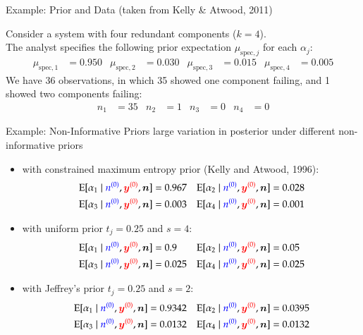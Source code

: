 \documentclass{beamer}
\def\rot#1{{\color{red}#1}}
\def\gruen#1{{\color{blue}#1}}
\def\byzr{\rot{\byz}}
\def\nzg{\gruen{\nz}}
\begin{document}
\begin{frame}{Example: Prior and Data}
  (taken from Kelly \& Atwood, 2011) %

  \begin{example}
    Consider a system with four redundant components ($k=4$). \\
    The analyst specifies
    the following prior expectation $\mu_{\text{spec},j}$
    for each $\alpha_j$:
    \begin{align*}
      \mu_{\text{spec},1}&=0.950
      &
      \mu_{\text{spec},2}&=0.030
      &
      \mu_{\text{spec},3}&=0.015
      &
      \mu_{\text{spec},4}&=0.005
    \end{align*}
    We have 36 observations, in which 35 showed one component failing,
    and 1 showed two components failing:
    \begin{align*}
      n_1&=35
      &
      n_2&=1
      &
      n_3&=0
      &
      n_4&=0
    \end{align*}
  \end{example}
\end{frame}

\begin{frame}{Example: Non-Informative Priors}
  \alert{large variation in posterior under different non-informative priors} \\
  \begin{itemize}
  \item with constrained maximum entropy prior (Kelly and Atwood, 1996): %
    \begin{align*}
      \E[\alpha_1\mid\nzg,\byzr,\vec{n}]&=0.967
      &
      \E[\alpha_2\mid\nzg,\byzr,\vec{n}]&=0.028
      \\
      \E[\alpha_3\mid\nzg,\byzr,\vec{n}]&=0.003
      &
      \E[\alpha_4\mid\nzg,\byzr,\vec{n}]&=0.001
    \end{align*}
  \item 
  with uniform prior $t_j=0.25$ and $s=4$:
  \begin{align*}
    \E[\alpha_1\mid\nzg,\byzr,\vec{n}]&=0.9
    &
    \E[\alpha_2\mid\nzg,\byzr,\vec{n}]&=0.05
    \\
    \E[\alpha_3\mid\nzg,\byzr,\vec{n}]&=0.025
    &
    \E[\alpha_4\mid\nzg,\byzr,\vec{n}]&=0.025
  \end{align*}
  \item
  with Jeffrey's prior $t_j=0.25$ and $s=2$:
  \begin{align*}
    \E[\alpha_1\mid\nzg,\byzr,\vec{n}]&=0.9342
    &
    \E[\alpha_2\mid\nzg,\byzr,\vec{n}]&=0.0395
    \\
    \E[\alpha_3\mid\nzg,\byzr,\vec{n}]&=0.0132
    &
    \E[\alpha_4\mid\nzg,\byzr,\vec{n}]&=0.0132
  \end{align*}
  \end{itemize}
\end{frame}
\end{document}

